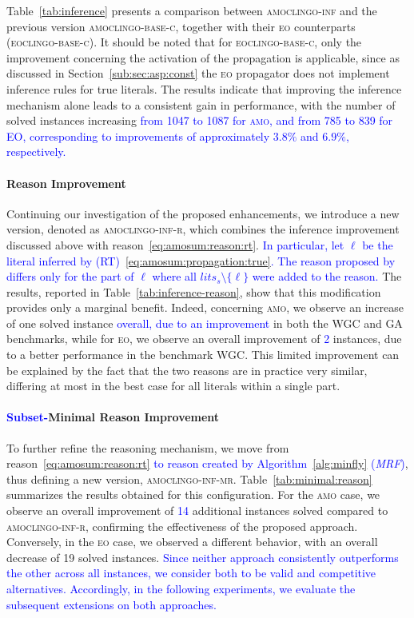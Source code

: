 \documentclass[preprint,authoryear]{elsarticle}
\newcommand{\lits}{\mathit{lits}}
\newcommand{\amoclingoijc}{\textsc{amoclingo-base-c}\xspace}
\newcommand{\amoclingoinf}{\textsc{amoclingo-inf}\xspace}
\newcommand{\amoclingoinfr}{\textsc{amoclingo-inf-r}\xspace}
\newcommand{\amoclingoinfmr}{\textsc{amoclingo-inf-mr}\xspace}
\newcommand{\eoclingoijc}{\textsc{eoclingo-base-c}\xspace}
\theoremstyle{definition}
\begin{document}
%
Table~\ref{tab:inference} presents a comparison between \amoclingoinf and the previous version \amoclingoijc, together with their \textsc{eo} counterparts (\eoclingoijc).  
It should be noted that for \eoclingoijc, only the improvement concerning the activation of the propagation is applicable, since  as discussed in Section~\ref{sub:sec:asp:const} the \textsc{eo} propagator does not implement inference rules for true literals.
%
The results indicate that improving the inference mechanism alone leads to a consistent gain in performance, with the number of solved instances increasing \textcolor{blue}{from 1047 to 1087 for \textsc{amo}, and from 785 to 839 for \textsc{EO}, corresponding to improvements of approximately $3.8\%$ and $6.9\%$, respectively.}

\paragraph{Reason Improvement}
Continuing our investigation of the proposed enhancements, we introduce a new version, denoted as \amoclingoinfr, which combines the inference improvement discussed above with reason~\eqref{eq:amosum:reason:rt}.
\textcolor{blue}{In particular, let $\ell$ be the literal inferred by (RT)~\eqref{eq:amosum:propagation:true}. The reason proposed by~\cite{DBLP:conf/ijcai/AlvianoDFM24} differs only for the part of $\ell$ where all $\lits_s\setminus \{\ell\}$ were added to the reason.}
The results, reported in Table~\ref{tab:inference-reason}, show that this modification provides only a marginal benefit. Indeed, concerning \textsc{amo}, we observe an increase of one solved instance \textcolor{blue}{overall, due to an improvement} in both the WGC and GA benchmarks, while for \textsc{eo}, we observe an overall improvement of \textcolor{blue}{2} instances, due to a better performance in the benchmark WGC.
This limited improvement can be explained by the fact that the two reasons are in practice very similar, differing at most in the best case for all literals within a single part.

\paragraph{\textcolor{blue}{Subset-}Minimal Reason Improvement}
To further refine the reasoning mechanism, we move from reason~\eqref{eq:amosum:reason:rt} \textcolor{blue}{to reason created by Algorithm~\ref{alg:minfly} (\textit{MRF})}, thus defining a new version, \amoclingoinfmr.
Table~\ref{tab:minimal:reason} summarizes the results obtained for this configuration.  
For the \textsc{amo} case, we observe an overall improvement of \textcolor{blue}{14} additional instances solved compared to \amoclingoinfr, confirming the effectiveness of the proposed approach.  
Conversely, in the \textsc{eo} case, we observed a different behavior, with an overall decrease of 19 solved instances.  
\textcolor{blue}{Since neither approach consistently outperforms the other across all instances, we consider both to be valid and competitive alternatives. Accordingly, in the following experiments, we evaluate the subsequent extensions on both approaches.}
\end{document}
